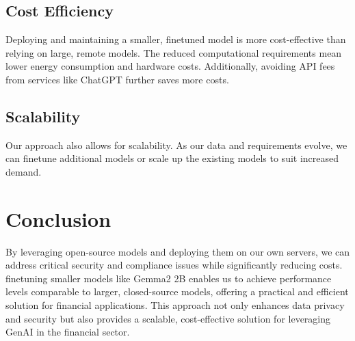 \documentclass[11pt, a4paper]{article}
\begin{document}
\subsection{Cost Efficiency}

Deploying and maintaining a smaller, finetuned model is more cost-effective than relying on large, remote models. The reduced computational requirements mean lower energy consumption and hardware costs. Additionally, avoiding API fees from services like ChatGPT further saves more costs.

\subsection{Scalability}

Our approach also allows for scalability. As our data and requirements evolve, we can finetune additional models or scale up the existing models to suit increased demand.

\section{Conclusion}

By leveraging open-source models and deploying them on our own servers, we can address critical security and compliance issues while significantly reducing costs. finetuning smaller models like Gemma2 2B enables us to achieve performance levels comparable to larger, closed-source models, offering a practical and efficient solution for financial applications. This approach not only enhances data privacy and security but also provides a scalable, cost-effective solution for leveraging GenAI in the financial sector.



\end{document}
